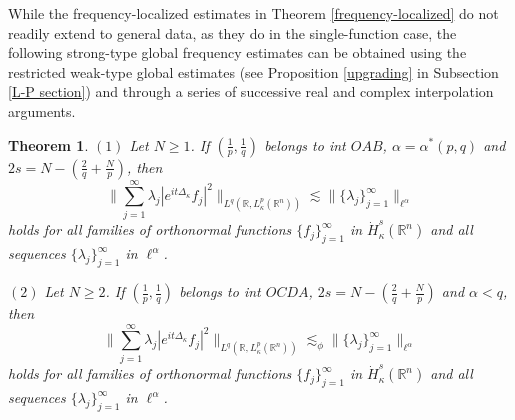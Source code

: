 \documentclass[a4paper,11pt, reqno]{amsart}
\numberwithin{equation}{section}
\theoremstyle{plain}
\newtheorem{theorem}{Theorem}[section]
\theoremstyle{definition}
\theoremstyle{remark}
\begin{document}
While the frequency-localized estimates in Theorem \ref{frequency-localized} do not readily extend to general data, as they do in the single-function case, the following strong-type global frequency estimates can be obtained using the restricted weak-type global estimates  (see Proposition \ref{upgrading} in Subsection \ref{L-P section}) and through a series of successive real and complex interpolation arguments.
\begin{theorem}\label{globally}
$(1)$ Let $N\geq 1$. If $(\frac{1}{p},\frac{1}{q})$ belongs to int $OAB$, $\alpha=\alpha^*(p,q)$ and $2s=N-\left(\frac{2}{q}+\frac{N}{p}\right)$, then
\begin{equation*}
			\bigg\|\sum_{j=1}^\infty \lambda_j|e^{it\Delta_\kappa}f_j|^2\bigg\|_{L^q(\mathbb{R}, L_\kappa^p(\mathbb{R}^n))}\lesssim \|\{\lambda_j\}^\infty_{j=1}\|_{\ell^{\alpha}} 
\end{equation*}	
  holds for all families of orthonormal functions $\{f_j\}_{j=1}^\infty$ in $\dot{H}_\kappa^{s}(\mathbb{R}^n)$ and all sequences $\{\lambda_j\}^\infty_{j=1}$ in $\ell^{\alpha}$. 
  
$(2)$ Let $N\geq 2$. If $(\frac{1}{p},\frac{1}{q})$ belongs to int $OCDA$, $2s=N-\left(\frac{2}{q}+\frac{N}{p}\right)$ and $\alpha<q$, then
\begin{equation*}
			\bigg\|\sum_{j=1}^\infty \lambda_j|e^{it\Delta_\kappa}f_j|^2\bigg\|_{L^q(\mathbb{R}, L_\kappa^p(\mathbb{R}^n))}\lesssim_\phi \|\{\lambda_j\}^\infty_{j=1}\|_{\ell^{\alpha}} 
\end{equation*}	
  holds for all families of orthonormal functions $\{f_j\}_{j=1}^\infty$ in $\dot{H}_\kappa^{s}(\mathbb{R}^n)$ and all sequences $\{\lambda_j\}^\infty_{j=1}$ in $\ell^{\alpha}$.  
\end{theorem}
\end{document}
